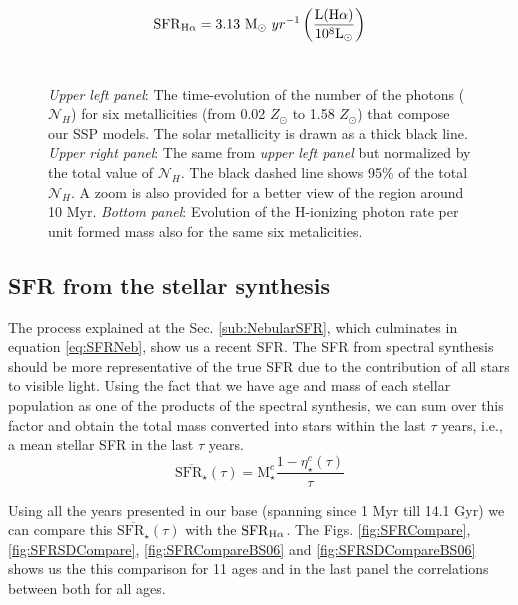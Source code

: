 \documentclass[a4paper,11pt]{article}
\begin{document}
\begin{equation}
	\label{eq:SFRNeb}
	\mathrm{SFR}_{\Halpha} = 3.13\ \mathrm{M}_\odot\ yr^{-1} \left(\frac{\mathrm{L}(\Halpha)}{10^8\mathrm{L}_\odot}\right)
\end{equation}
\
\begin{figure*}
\caption{\emph{Upper left panel}: The time-evolution of the number of the photons ($\mathcal{N}_H$) for six metallicities (from 0.02 $Z_\odot$ to 1.58 $Z_\odot$) that compose our SSP models. The solar metallicity is drawn as a thick black line. \emph{Upper right panel}: The same from \emph{upper left panel} but normalized by the total value of $\mathcal{N}_H$. The black dashed line shows 95\% of the total $\mathcal{N}_H$. A zoom is also provided for a better view of the region around 10 Myr. \emph{Bottom panel}: Evolution of the H-ionizing photon rate per unit formed mass also for the same six metalicities.}
\label{fig:Nh_qh}
\end{figure*}

\subsection{SFR from the stellar synthesis}
\label{sub:StellarSFR}
The process explained at the Sec. \ref{sub:NebularSFR}, which culminates in equation \eqref{eq:SFRNeb}, show us a recent SFR.  The SFR from spectral synthesis should be more representative of the true SFR due to the contribution of all stars to visible light. Using the fact that we have age and mass of each stellar population as one of the products of the spectral synthesis, we can sum over this factor and obtain the total mass converted into stars within the last $\tau$ years, i.e., a mean stellar SFR in the last $\tau$ years.
\begin{equation}
	\label{eq:MeanStellarSFR}
	\overline{\mathrm{SFR}_\star}(\tau) = \mathrm{M}_\star^c \frac{1 - \eta_\star^c(\tau)}{\tau}
\end{equation}

Using all the years presented in our base (spanning since 1 Myr till 14.1 Gyr) we can compare this $\overline{\mathrm{SFR}_\star}(\tau)$ with the $\mathrm{SFR}_{\Halpha}$. The Figs. \ref{fig:SFRCompare}, \ref{fig:SFRSDCompare}, \ref{fig:SFRCompareBS06} and \ref{fig:SFRSDCompareBS06} shows us the this comparison for 11 ages and in the last panel the correlations between both for all ages. 
\end{document}
